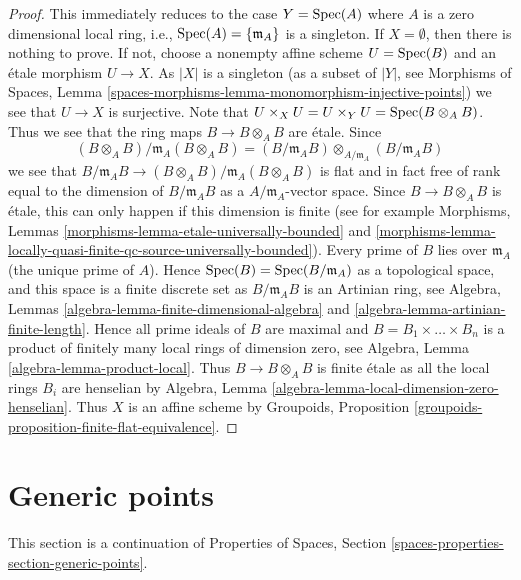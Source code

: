 \begin{proof}
This immediately reduces to the case $Y = \operatorname{Spec}(A)$ where
$A$ is a zero dimensional local ring, i.e.,
$\operatorname{Spec}(A) = \{\mathfrak m_A\}$
is a singleton. If $X = \emptyset$, then there is nothing to prove.
If not, choose a nonempty affine scheme $U = \operatorname{Spec}(B)$
and an \'etale morphism $U \to X$. As $|X|$ is a singleton (as a
subset of $|Y|$, see
Morphisms of Spaces, Lemma
\ref{spaces-morphisms-lemma-monomorphism-injective-points})
we see that $U \to X$ is surjective. Note that
$U \times_X U = U \times_Y U = \operatorname{Spec}(B \otimes_A B)$.
Thus we see that the ring maps $B \to B \otimes_A B$ are \'etale.
Since
$$
(B \otimes_A B)/\mathfrak m_A(B \otimes_A B)
=
(B/\mathfrak m_AB) \otimes_{A/\mathfrak m_A} (B/\mathfrak m_AB)
$$
we see that
$B/\mathfrak m_AB \to (B \otimes_A B)/\mathfrak m_A(B \otimes_A B)$
is flat and in fact free of rank equal to the dimension of
$B/\mathfrak m_AB$ as a $A/\mathfrak m_A$-vector space. Since
$B \to B \otimes_A B$ is \'etale, this can only happen if this
dimension is finite (see for example
Morphisms, Lemmas \ref{morphisms-lemma-etale-universally-bounded} and
\ref{morphisms-lemma-locally-quasi-finite-qc-source-universally-bounded}).
Every prime of $B$ lies over $\mathfrak m_A$ (the unique prime of $A$).
Hence $\operatorname{Spec}(B) = \operatorname{Spec}(B/\mathfrak m_A)$ as a topological
space, and this space is a finite discrete set as $B/\mathfrak m_A B$
is an Artinian ring, see
Algebra, Lemmas \ref{algebra-lemma-finite-dimensional-algebra} and
\ref{algebra-lemma-artinian-finite-length}.
Hence all prime ideals of $B$ are maximal and
$B = B_1 \times \ldots \times B_n$ is a product of finitely many
local rings of dimension zero, see
Algebra, Lemma \ref{algebra-lemma-product-local}.
Thus $B \to B \otimes_A B$ is finite \'etale as all the local rings
$B_i$ are henselian by
Algebra, Lemma \ref{algebra-lemma-local-dimension-zero-henselian}.
Thus $X$ is an affine scheme by
Groupoids, Proposition \ref{groupoids-proposition-finite-flat-equivalence}.
\end{proof}

\section{Generic points}
\label{decent-spaces-section-generic-points}
This section is a continuation of
Properties of Spaces, Section \ref{spaces-properties-section-generic-points}.

